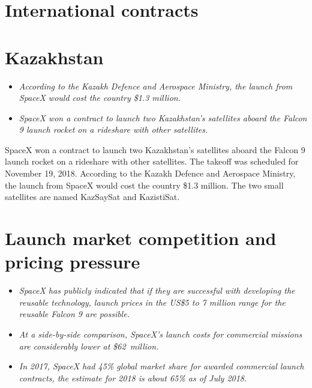 \section{International contracts}\label{international-contracts}

\section{Kazakhstan}\label{kazakhstan}

\begin{itemize}
\item
  \emph{According to the Kazakh Defence and Aerospace Ministry, the
  launch from SpaceX would cost the country \$1.3 million.}
\item
  \emph{SpaceX won a contract to launch two Kazakhstan's satellites
  aboard the Falcon 9 launch rocket on a rideshare with other
  satellites.}
\end{itemize}

SpaceX won a contract to launch two Kazakhstan's satellites aboard the
Falcon 9 launch rocket on a rideshare with other satellites. The takeoff
was scheduled for November 19, 2018. According to the Kazakh Defence and
Aerospace Ministry, the launch from SpaceX would cost the country \$1.3
million. The two small satellites are named KazSaySat and KazistiSat.

\section{Launch market competition and pricing
pressure}\label{launch-market-competition-and-pricing-pressure}

\begin{itemize}
\item
  \emph{SpaceX has publicly indicated that if they are successful with
  developing the reusable technology, launch prices in the US\$5 to 7
  million range for the reusable Falcon 9 are possible.}
\item
  \emph{At a side-by-side comparison, SpaceX's launch costs for
  commercial missions are considerably lower at \$62~million.}
\item
  \emph{In 2017, SpaceX had 45\% global market share for awarded
  commercial launch contracts, the estimate for 2018 is about 65\% as of
  July 2018.}
\end{itemize}

